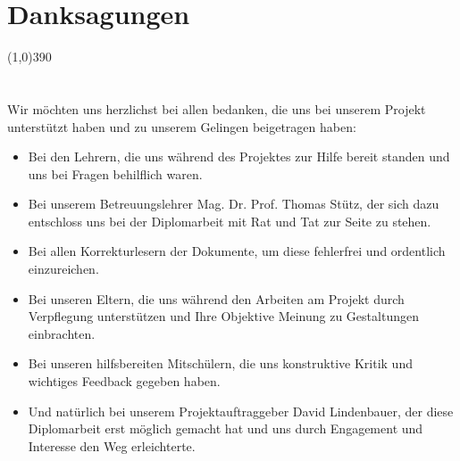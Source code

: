 \documentclass[FIPLY_base.tex]{subfiles}
\begin{document}
	\section{Danksagungen}
	\line(1,0){390}
	\ \\
	\ \\
	\ \\
	Wir möchten uns herzlichst bei allen bedanken, die uns bei unserem Projekt unterstützt haben und zu unserem Gelingen beigetragen haben:
	\ \\
	\begin{itemize}
		\item Bei den Lehrern, die uns während des Projektes zur Hilfe bereit standen und uns bei Fragen behilflich waren.
		\ \\
		\item Bei unserem Betreuungslehrer Mag. Dr. Prof. Thomas Stütz, der sich dazu entschloss uns bei der Diplomarbeit mit Rat und Tat zur Seite zu stehen.
		\ \\
		\item Bei allen Korrekturlesern der Dokumente, um diese fehlerfrei und ordentlich einzureichen.
		\ \\
		\item Bei unseren Eltern, die uns während den Arbeiten am Projekt durch Verpflegung unterstützen und Ihre Objektive Meinung zu Gestaltungen einbrachten.
		\ \\
		\item Bei unseren hilfsbereiten Mitschülern, die uns konstruktive Kritik und wichtiges Feedback gegeben haben.
		\ \\
		\item Und natürlich bei unserem Projektauftraggeber David Lindenbauer, der diese Diplomarbeit erst möglich gemacht hat und uns durch Engagement und Interesse den Weg erleichterte.
	\end{itemize} 
\end{document}
